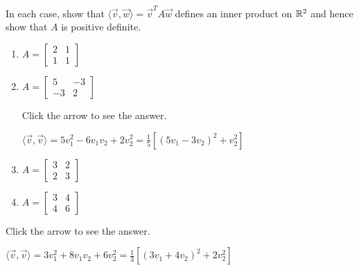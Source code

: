 \documentclass{ximera}
\begin{document}
\begin{problem}\label{prob:inner_prod_12}
In each case, show that $\langle\vec{v}, \vec{w}\rangle = \vec{v}^{T}A\vec{w}$ defines an inner product on $\mathbb{R}^2$ and hence show that $A$ is positive definite.
\begin{enumerate}
\item
$A =
\left[ \begin{array}{rr}
2 & 1 \\
1 & 1
\end{array} \right]$

\item
$A =
\left[ \begin{array}{rr}
5 & -3 \\
-3 & 2
\end{array} \right]$

Click the arrow to see the answer.
\begin{expandable}{}{}
$  \langle \vec{v}, \vec{v} \rangle = 5v_1^2 - 6v_1v_2 + 2v_2^2 =
\frac{1}{5}[(5v_1 - 3v_2)^2 + v_2^2] $
\end{expandable}

\item
$A =
\left[ \begin{array}{rr}
3 & 2 \\
2 & 3
\end{array} \right]$

\item
$A =
\left[ \begin{array}{rr}
3 & 4 \\
4 & 6
\end{array} \right]$
\end{enumerate}

Click the arrow to see the answer.
\begin{expandable}{}{}
$ \langle \vec{v}, \vec{v} \rangle = 3v_1^2 + 8v_1v_2 + 6v_2^2 =
\frac{1}{3}[(3v_1 + 4v_2)^2 + 2v_2^2] $
\end{expandable}
\end{problem}
\end{document}
